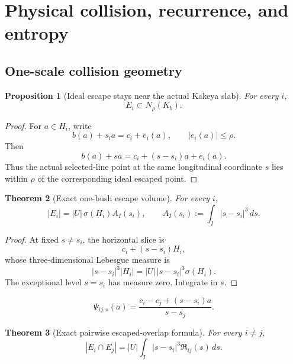 \documentclass[10pt]{article}
\newtheorem{theorem}{Theorem}[section]
\newtheorem{proposition}[theorem]{Proposition}
\begin{document}
\clearpage
\section{Physical collision, recurrence, and entropy}
\label{sec:v034-entropy-pruning}

\subsection{One-scale collision geometry}

\begin{proposition}[Ideal escape stays near the actual Kakeya slab]
\label{prop:v014-near-K}
For every \(i\),
\begin{equation}
\label{eq:v014-near-K}
\boxed{
E_i
\subset
N_\rho(K_b).
}
\end{equation}
\end{proposition}

\begin{proof}
For \(a\in H_i\), write
\[
b(a)+s_i a=c_i+e_i(a),
\qquad
|e_i(a)|\le\rho.
\]
Then
\[
b(a)+sa
=
c_i+(s-s_i)a+e_i(a).
\]
Thus the actual selected-line point at the same longitudinal coordinate \(s\) lies within
\(\rho\) of the corresponding ideal escaped point.
\end{proof}

\begin{theorem}[Exact one-bush escape volume]
\label{thm:v014-one-volume}
For every \(i\),
\begin{equation}
\label{eq:v014-one-volume}
\boxed{
|E_i|
=
|U|\,\sigma(H_i)
A_I(s_i),
\qquad
A_I(s_i)
:=
\int_I|s-s_i|^3\,ds.
}
\end{equation}
\end{theorem}

\begin{proof}
At fixed \(s\neq s_i\), the horizontal slice is
\[
c_i+(s-s_i)H_i,
\]
whose three-dimensional Lebesgue measure is
\[
|s-s_i|^3|H_i|
=
|U|\,|s-s_i|^3\sigma(H_i).
\]
The exceptional level \(s=s_i\) has measure zero.  Integrate in \(s\).
\end{proof}

\begin{equation}
\label{eq:v014-Psi}
\boxed{
\Psi_{ij,s}(a)
=
\frac{
c_i-c_j+(s-s_i)a
}{
s-s_j
}.
}
\end{equation}

\begin{theorem}[Exact pairwise escaped-overlap formula]
\label{thm:v014-pair-overlap}
For every \(i\neq j\),
\begin{equation}
\label{eq:v014-pair-overlap}
\boxed{
|E_i\cap E_j|
=
|U|
\int_I
|s-s_i|^3
\mathfrak R_{ij}(s)\,ds.
}
\end{equation}
\end{theorem}
\end{document}
